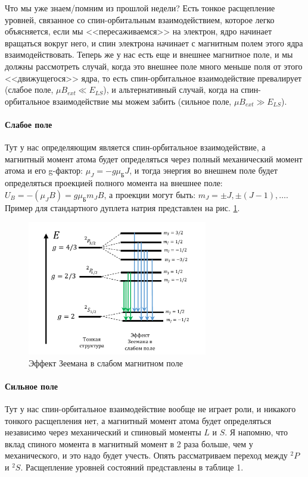 \documentclass[12pt]{article}
\begin{document}
Что мы уже знаем/помним из прошлой недели? Есть тонкое расщепление уровней, связанное со спин-орбитальным взаимодействием, которое легко объясняется, если мы <<пересаживаемся>> на электрон, ядро начинает вращаться вокруг него, и спин электрона начинает с магнитным полем этого ядра взаимодействовать. Теперь же у нас есть еще и внешнее магнитное поле, и мы должны рассмотреть случай, когда это внешнее поле много меньше поля от этого <<движущегося>> ядра, то есть спин-орбитальное взаимодействие превалирует (слабое поле, $\mu B_{ext} \ll E_{LS}$), и альтернативный случай, когда на спин-орбитальное взаимодействие мы можем забить (сильное поле, $\mu B_{ext} \gg E_{LS}$).

\paragraph{Слабое поле} Тут у нас определяющим является спин-орбитальное взаимодействие, а магнитный момент атома будет определяться через полный механический момент атома и его g-фактор: $\mu_J = -g\mu_{\text{Б}}J$, и тогда энергия во внешнем поле будет определяться проекцией полного момента на внешнее поле: $U_B = -(\mu_J B) = g\mu_{\text{Б}}m_JB$, а проекции могут быть: $m_J = \pm J, \pm (J-1), \dots$. Пример для стандартного дуплета натрия представлен на рис. \ref{fig:sem_08_weak_zeeman}.

\begin{figure}[h!]
    \centering
    \includegraphics[width=0.7\textwidth,height=\textheight,keepaspectratio]{Seminar_08/pics/pic_03.pdf}
    \caption{Эффект Зеемана в слабом магнитном поле}
    \label{fig:sem_08_weak_zeeman}
\end{figure}

\paragraph{Сильное поле} Тут у нас спин-орбитальное взаимодействие вообще не играет роли, и никакого тонкого расщепления нет, а магнитный момент атома будет определяться независимо через механический и спиновый моменты $L$ и $S$. Я напомню, что вклад спиного момента в магнитный момент в 2 раза больше, чем у механического, и это надо будет учесть. Опять рассматриваем переход между ${}^2P$ и ${}^2S$. Расщепление уровней состояний представлены в таблице 1.
\end{document}
